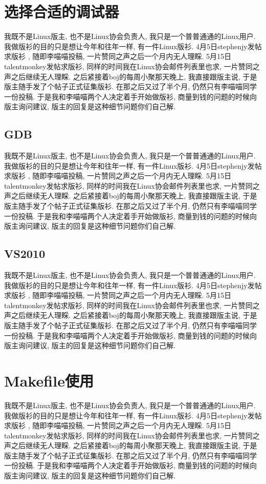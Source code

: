 \section{选择合适的调试器}
我既不是Linux版主, 也不是Linux协会负责人, 我只是一个普普通通的Linux用户. 我做版衫的目的只是想让今年和往年一样, 有一件Linux版衫. 4月5日stephenjy发帖求版衫 , 随即李喵喵投稿, 一片赞同之声之后一个月内无人理睬. 5月15日talentmonkey发帖求版衫, 同样的时间我在Linux协会邮件列表里也求, 一片赞同之声之后继续无人理睬. 之后紧接着boj的每周小聚那天晚上, 我直接跟版主说, 于是版主随手发了个帖子正式征集版衫. 在那之后又过了半个月, 仍然只有李喵喵同学一份投稿. 于是我和李喵喵两个人决定着手开始做版衫, 商量到钱的问题的时候向版主询问建议, 版主的回复是这种细节问题你们自己解.
\subsection{GDB}
我既不是Linux版主, 也不是Linux协会负责人, 我只是一个普普通通的Linux用户. 我做版衫的目的只是想让今年和往年一样, 有一件Linux版衫. 4月5日stephenjy发帖求版衫 , 随即李喵喵投稿, 一片赞同之声之后一个月内无人理睬. 5月15日talentmonkey发帖求版衫, 同样的时间我在Linux协会邮件列表里也求, 一片赞同之声之后继续无人理睬. 之后紧接着boj的每周小聚那天晚上, 我直接跟版主说, 于是版主随手发了个帖子正式征集版衫. 在那之后又过了半个月, 仍然只有李喵喵同学一份投稿. 于是我和李喵喵两个人决定着手开始做版衫, 商量到钱的问题的时候向版主询问建议, 版主的回复是这种细节问题你们自己解.
\subsection{VS2010}
我既不是Linux版主, 也不是Linux协会负责人, 我只是一个普普通通的Linux用户. 我做版衫的目的只是想让今年和往年一样, 有一件Linux版衫. 4月5日stephenjy发帖求版衫 , 随即李喵喵投稿, 一片赞同之声之后一个月内无人理睬. 5月15日talentmonkey发帖求版衫, 同样的时间我在Linux协会邮件列表里也求, 一片赞同之声之后继续无人理睬. 之后紧接着boj的每周小聚那天晚上, 我直接跟版主说, 于是版主随手发了个帖子正式征集版衫. 在那之后又过了半个月, 仍然只有李喵喵同学一份投稿. 于是我和李喵喵两个人决定着手开始做版衫, 商量到钱的问题的时候向版主询问建议, 版主的回复是这种细节问题你们自己解.

\section{Makefile使用}
我既不是Linux版主, 也不是Linux协会负责人, 我只是一个普普通通的Linux用户. 我做版衫的目的只是想让今年和往年一样, 有一件Linux版衫. 4月5日stephenjy发帖求版衫 , 随即李喵喵投稿, 一片赞同之声之后一个月内无人理睬. 5月15日talentmonkey发帖求版衫, 同样的时间我在Linux协会邮件列表里也求, 一片赞同之声之后继续无人理睬. 之后紧接着boj的每周小聚那天晚上, 我直接跟版主说, 于是版主随手发了个帖子正式征集版衫. 在那之后又过了半个月, 仍然只有李喵喵同学一份投稿. 于是我和李喵喵两个人决定着手开始做版衫, 商量到钱的问题的时候向版主询问建议, 版主的回复是这种细节问题你们自己解.


